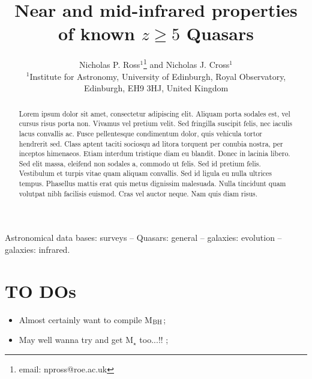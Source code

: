 \documentclass[usenatbib]{mnras}
\begin{document}
\title[Very high-$z$ Quasars]
        {Near and mid-infrared properties of known $z\geq5$ Quasars}
\author[N.P. Ross et al.]
       {Nicholas P. Ross$^{1}$\thanks{email: npross@roe.ac.uk} and Nicholas J. Cross$^{1}$
\\ 
$^1$Institute for Astronomy, University of Edinburgh, Royal Observatory, Edinburgh, EH9 3HJ, United Kingdom\\
}

\maketitle
\begin{abstract}
Lorem ipsum dolor sit amet, consectetur adipiscing elit. Aliquam porta
sodales est, vel cursus risus porta non. Vivamus vel pretium
velit. Sed fringilla suscipit felis, nec iaculis lacus convallis
ac. Fusce pellentesque condimentum dolor, quis vehicula tortor
hendrerit sed. Class aptent taciti sociosqu ad litora torquent per
conubia nostra, per inceptos himenaeos. Etiam interdum tristique diam
eu blandit. Donec in lacinia libero.
Sed elit massa, eleifend non sodales a, commodo ut felis. Sed id
pretium felis. Vestibulum et turpis vitae quam aliquam convallis. Sed
id ligula eu nulla ultrices tempus. Phasellus mattis erat quis metus
dignissim malesuada. Nulla tincidunt quam volutpat nibh facilisis
euismod. Cras vel auctor neque. Nam quis diam risus.
\end{abstract}


\begin{keywords}
Astronomical data bases: surveys -- 
Quasars: general -- 
galaxies: evolution -- 
galaxies: infrared.
\end{keywords}



\section*{TO DOs}
\begin{itemize}
\item Almost certainly want to compile M$_{\rm BH}$; 
\item May well wanna try and get M$_{\star}$ too...!! ; 
\end{itemize}



\end{document}
